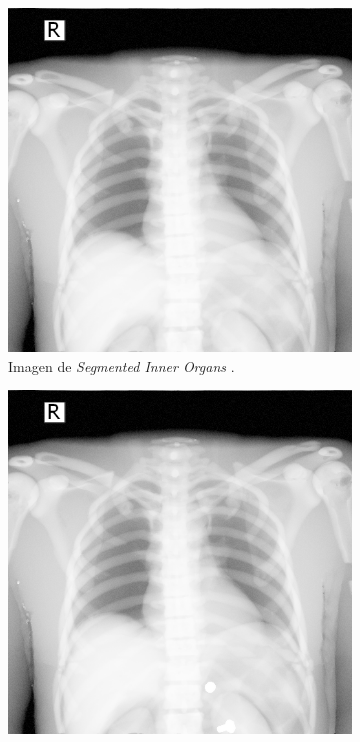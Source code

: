 \begin{figure}[ht]
\begin{subfigure}[b]{0.3\linewidth}
        \centering
\includegraphics[width=\linewidth]{IMG/HVPForeign.png}
        \caption{Imagen  de \emph{Segmented Inner Organs} \cite{VoxelMan}.}
    \end{subfigure}
    \null\hfill
    \begin{subfigure}[b]{0.3\linewidth}
        \centering
        {\includegraphics[width=\linewidth]{IMG/HVPNormal.png}}

\end{subfigure}
\end{figure}
